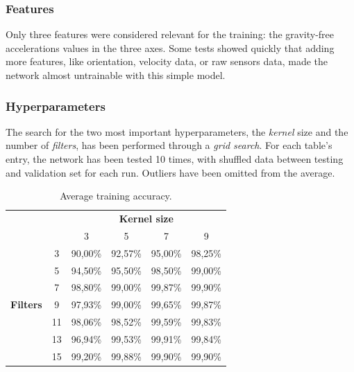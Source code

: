 \subsubsection{Features}
Only three features were considered relevant for the training: the gravity-free accelerations values in the three axes. Some tests showed quickly that adding more features, like orientation, velocity data, or raw sensors data, made the network almost untrainable with this simple model.

\subsubsection{Hyperparameters}
The search for the two most important hyperparameters, the \textit{kernel} size and the number of \textit{filters}, has been performed through a \textit{grid search}. For each table's entry, the network has been tested 10 times, with shuffled data between testing and validation set for each run. Outliers have been omitted from the average.

\begin{table}[ht]
	\centering
	\begin{tabular}{cccccc}
									  &                         & \multicolumn{4}{c}{\textbf{Kernel size}} \\
									  & \multicolumn{1}{c|}{}   & 3        & 5        & 7        & 9       \\ \cline{2-6} 
	\multirow{7}{*}{\textbf{Filters}} & \multicolumn{1}{c|}{3}  & 90,00\%  & 92,57\%  & 95,00\%  & 98,25\% \\
									  & \multicolumn{1}{c|}{5}  & 94,50\%  & 95,50\%  & 98,50\%  & 99,00\% \\
									  & \multicolumn{1}{c|}{7}  & 98,80\%  & 99,00\%  & 99,87\%  & 99,90\% \\
									  & \multicolumn{1}{c|}{9}  & 97,93\%  & 99,00\%  & 99,65\%  & 99,87\% \\
									  & \multicolumn{1}{c|}{11} & 98,06\%  & 98,52\%  & 99,59\%  & 99,83\% \\
									  & \multicolumn{1}{c|}{13} & 96,94\%  & 99,53\%  & 99,91\%  & 99,84\% \\
									  & \multicolumn{1}{c|}{15} & 99,20\%  & 99,88\%  & 99,90\%  & 99,90\%
	\end{tabular}
	\caption{Average training accuracy.}
\end{table}

